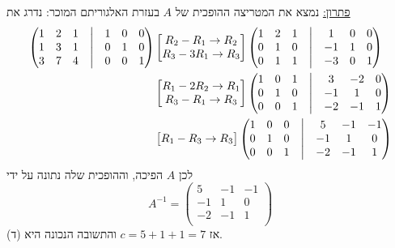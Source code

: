 \documentclass[12pt, a4paper]{article}
\begin{document}
\begin{enumerate}
\underline{פתרון:}
נמצא את המטריצה ההופכית של
$A$
בעזרת האלגוריתם המוכר:
נדרג את
\begin{align*}
\begin{pmatrix}
1&2&1&\bigm|&1&0&0\\
1&3&1&\bigm|&0&1&0\\
3&7&4&\bigm|&0&0&1\\
\end{pmatrix}
&\begin{bmatrix}
R_2-R_1\rightarrow R_2\\
R_3-3R_1\rightarrow R_3\\
\end{bmatrix}
\begin{pmatrix}
1&2&1&\bigm|&1&0&0\\
0&1&0&\bigm|&-1&1&0\\
0&1&1&\bigm|&-3&0&1\\
\end{pmatrix}
\\&\begin{bmatrix}
R_1-2R_2\rightarrow R_1\\
R_3-R_1\rightarrow R_3\\
\end{bmatrix}
\begin{pmatrix}
1&0&1&\bigm|&3&-2&0\\
0&1&0&\bigm|&-1&1&0\\
0&0&1&\bigm|&-2&-1&1\\
\end{pmatrix}
\\&\begin{bmatrix}
R_1-R_3\rightarrow R_3\\
\end{bmatrix}
\begin{pmatrix}
1&0&0&\bigm|&5&-1&-1\\
0&1&0&\bigm|&-1&1&0\\
0&0&1&\bigm|&-2&-1&1\\
\end{pmatrix}
\end{align*}
לכן
$A$
הפיכה,
 וההופכית שלה נתונה על ידי
 $$A^{-1}=
 \begin{pmatrix}
5&-1&-1\\
-1&1&0\\
-2&-1&1\\
\end{pmatrix}$$
אז
$c=5+1+1=7$
והתשובה הנכונה היא (ד).


\newpage


\end{enumerate}
\end{document}
